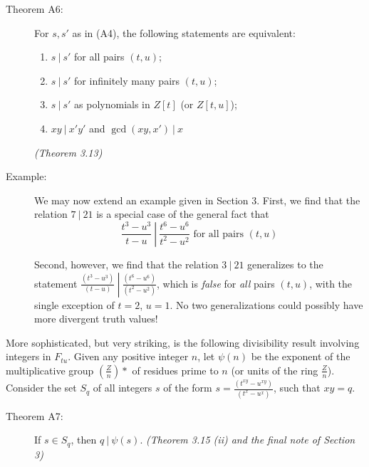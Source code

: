 \begin{description}

  \item[Theorem A6:] For $s,s'$ as in (A4), the following statements are equivalent:
    \begin{enumerate}[\hspace{1cm}(i)]
      \item $s\ |\ s'$ for all pairs $(t,u)$;
      \item $s\ |\ s'$ for infinitely many pairs $(t,u)$;
      \item $s\ |\ s'$ as polynomials in $Z[t]$ (or $Z[t,u]$);
      \item $xy\ |\ x'y'$ and $\gcd(xy,x')\ |\ x$ 
    \end{enumerate}
    \emph{(Theorem 3.13)}

  \item[Example:] We may now extend an example given in Section 3. First, we find that the relation $7\ |\ 21$ is a special case of the general fact that
    \begin{equation*}
    \frac{t^{3}-u^{3}}{t-u}\ \left|\ \frac{t^{6}-u^{6}}{t^{2}-u^{2}} \right. \text{ for all pairs } (t,u)
    \end{equation*}

    Second, however, we find that the relation $3\ |\ 21$ generalizes to the statement $\frac{(t^{3}-u^{3})}{(t-u)}\ \left|\ \frac{(t^{6}-u^{6})}{(t^{2}-u^{2})} \right.$, which is \emph{false} for \emph{all} pairs $(t,u)$, with the single exception of $t = 2$, $u = 1$. No two generalizations could possibly have more divergent truth values!

\end{description}

More sophisticated, but very striking, is the following divisibility result involving integers in $F_{tu}$. Given any positive integer $n$, let $\psi(n)$ be the exponent of the multiplicative group $\left( \frac{Z}{n} \right) *$ of residues prime to $n$ (or units of the ring $\frac{Z}{n}$). Consider the set $S_{q}$ of all integers $s$ of the form $s = \frac{(t^{xy}-u^{xy})}{(t^{x}-u^{x})}$, such that $xy = q$.

\begin{description}

  \item[Theorem A7:] If $s \in S_{q}$, then $q\ |\ \psi(s)$. \emph{(Theorem 3.15 (ii) and the final note of Section 3)}

\end{description}

